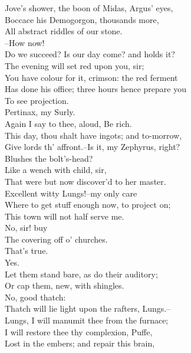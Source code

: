 \documentclass{memoir}
\begin{document}
\begin{drama*}
 Jove's shower, the boon of Midas, Argus' eyes,\\
 Boccace his Demogorgon, thousands more,\\
 All abstract riddles of our stone.\\
 --How now!\\
 Do we succeed? Is our day come? and holds it?\\
\facespeaks  The evening will set red upon you, sir;\\
 You have colour for it, crimson: the red ferment\\
 Has done his office; three hours hence prepare you\\
 To see projection.\\
\mammonspeaks {} Pertinax, my Surly.\\
 Again I say to thee, aloud, Be rich.\\
 This day, thou shalt have ingots; and to-morrow,\\
 Give lords th' affront.--Is it, my Zephyrus, right?\\
 Blushes the bolt's-head?\\
\facespeaks {} Like a wench with child, sir,\\
 That were but now discover'd to her master.\\
\mammonspeaks  Excellent witty Lungs!--my only care\\
 Where to get stuff enough now, to project on;\\
 This town will not half serve me.\\
\facespeaks {} No, sir! buy\\
 The covering off o' churches.\\
\mammonspeaks {} That's true.\\
\facespeaks  Yes.\\
 Let them stand bare, as do their auditory;\\
 Or cap them, new, with shingles.\\
\mammonspeaks {} No, good thatch:\\
 Thatch will lie light upon the rafters, Lungs.--\\
 Lungs, I will manumit thee from the furnace;\\
 I will restore thee thy complexion, Puffe,\\
 Lost in the embers; and repair this brain,\\

\end{drama*}
\end{document}
